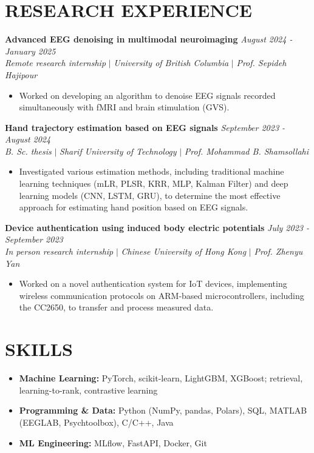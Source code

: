 \documentclass[11pt,a4paper,roman]{moderncv}        %
\begin{document}
    \vspace{-3mm}

	\newpage
	\section{RESEARCH EXPERIENCE}
    \textbf{Advanced EEG denoising in multimodal neuroimaging} \hfill{\emph{August 2024 - January 2025}}\\ \emph{Remote research internship} $|$ \emph{University of British Columbia} $|$ \emph{Prof. Sepideh Hajipour} \vspace{2mm}  \begin{itemize}
        \item Worked on developing an algorithm to denoise EEG signals recorded simultaneously with fMRI and brain stimulation (GVS).
    \end{itemize} 
    \vspace{2mm}
    \textbf{Hand trajectory estimation based on EEG signals} \hfill{\emph{September 2023 - August 2024}} \\ \emph{B. Sc. thesis} $|$ \emph{Sharif University of Technology} $|$ \emph{Prof. Mohammad B. Shamsollahi} \vspace{2mm} \begin{itemize}
        \item Investigated various estimation methods, including traditional machine learning techniques (mLR, PLSR, KRR, MLP, Kalman Filter) and deep learning models (CNN, LSTM, GRU), to determine the most effective approach for estimating hand position based on EEG signals.
    \end{itemize}
    \vspace{2mm}
    \textbf{Device authentication using induced body electric potentials} \hfill{\emph{July 2023 - September 2023}} \\ \emph{In person research internship} $|$ \emph{Chinese University of Hong Kong} $|$ \emph{Prof. Zhenyu Yan} \vspace{2mm} \begin{itemize}
        \item Worked on a novel authentication system for IoT devices, implementing wireless communication protocols on ARM-based microcontrollers, including the CC2650, to transfer and process measured data.
    \end{itemize}
 \vspace{-3mm}

 \section{SKILLS}
    \begin{itemize}
        \item \textbf{Machine Learning:} PyTorch, scikit-learn, LightGBM, XGBoost; retrieval, learning-to-rank, contrastive learning
        \item \textbf{Programming \& Data:} Python (NumPy, pandas, Polars), SQL, MATLAB (EEGLAB, Psychtoolbox), C/C++, Java
        \item \textbf{ML Engineering:} MLflow, FastAPI, Docker, Git
    \end{itemize}
    
\end{document}
